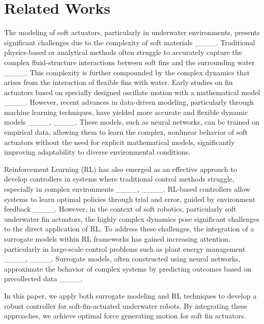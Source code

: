 \section{Related Works}
The modeling of soft actuators, particularly in underwater environments, presents significant challenges due to the complexity of soft materials ____. Traditional physics-based or analytical methods often struggle to accurately capture the complex fluid-structure interactions between soft fins and the surrounding water ____. This complexity is further compounded by the complex dynamics that arises from the interaction of flexible fins with water. Early studies on fin actuators based on specially designed oscillate motion with a mathematical model ____. However, recent advances in data-driven modeling, particularly through machine learning techniques, have yielded more accurate and flexible dynamic models ____, ____. These models, such as neural networks, can be trained on empirical data, allowing them to learn the complex, nonlinear behavior of soft actuators without the need for explicit mathematical models, significantly improving adaptability to diverse environmental conditions.

Reinforcement Learning (RL) has also emerged as an effective approach to develop controllers in systems where traditional control methods struggle, especially in complex environments ____, ____. RL-based controllers allow systems to learn optimal policies through trial and error, guided by environment feedback ____. However, in the context of soft robotics, particularly soft underwater fin actuators, the highly complex dynamics pose significant challenges to the direct application of RL. To address these challenges, the integration of a surrogate models within RL frameworks has gained increasing attention, particularly in large-scale control problems such as plant energy management ____, ____. Surrogate models, often constructed using neural networks, approximate the behavior of complex systems by predicting outcomes based on precollected data ____. 

In this paper, we apply both surrogate modeling and RL techniques to develop a robust controller for soft-fin-actuated underwater robots. By integrating these approaches, we achieve optimal force generating motion for soft fin actuators.
